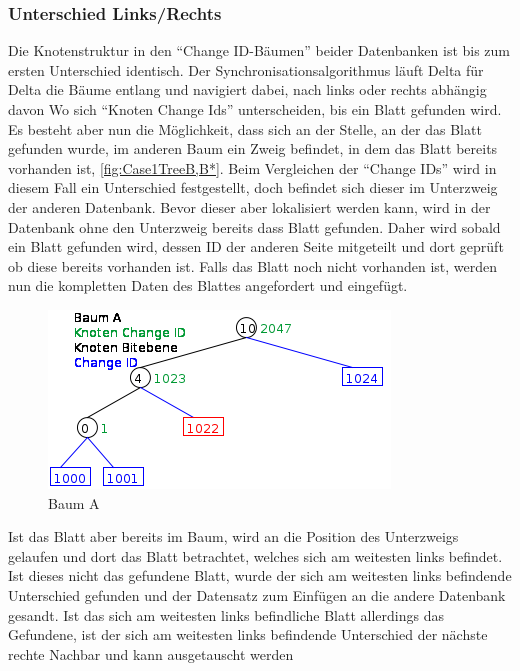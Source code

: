 \documentclass[a4paper,11pt,oneside,%
headsepline,												%
footsepline,												%
bibtotocnumbered									%
]{scrreprt}
\begin{document}
\subsubsection{Unterschied Links/Rechts}
\label{sssec:SynchroDiffLeftOrRight}
Die Knotenstruktur in den \enquote{Change ID-Bäumen} beider Datenbanken ist bis zum ersten Unterschied identisch. Der Synchronisationsalgorithmus läuft Delta für Delta die Bäume entlang und navigiert dabei, nach links oder rechts abhängig davon Wo sich \enquote{Knoten Change Ids} unterscheiden, bis ein Blatt gefunden wird. Es besteht aber nun die Möglichkeit, dass sich an der Stelle, an der das Blatt gefunden wurde, im anderen Baum ein Zweig befindet, in dem das Blatt bereits vorhanden ist, \autoref{fig:Case1TreeB,B*}. Beim Vergleichen der \enquote{Change IDs} wird in diesem Fall ein Unterschied festgestellt, doch befindet sich dieser im Unterzweig der anderen Datenbank. Bevor dieser aber lokalisiert werden kann, wird in der Datenbank ohne den Unterzweig bereits dass Blatt gefunden. Daher wird sobald ein Blatt gefunden wird, dessen ID der anderen Seite mitgeteilt und dort geprüft ob diese bereits vorhanden ist. Falls das Blatt noch nicht vorhanden ist, werden nun die kompletten Daten des Blattes angefordert und eingefügt.\begin{figure}
  \begin{center}
    \includegraphics[width=0.9\linewidth]{bilder/Case1TreeA.png}
  \end{center}
 \caption{Baum A}
 \label{fig:Case1TreeA}
\end{figure} Ist das Blatt aber bereits im Baum, wird an die Position des Unterzweigs gelaufen und dort das Blatt betrachtet, welches sich am weitesten links befindet. Ist dieses nicht das gefundene Blatt, wurde der sich am weitesten links befindende Unterschied gefunden und der Datensatz zum Einfügen an die andere Datenbank gesandt. Ist das sich am weitesten links befindliche Blatt allerdings das Gefundene, ist der sich am weitesten links befindende Unterschied der nächste rechte Nachbar und kann ausgetauscht werden
\end{document}

